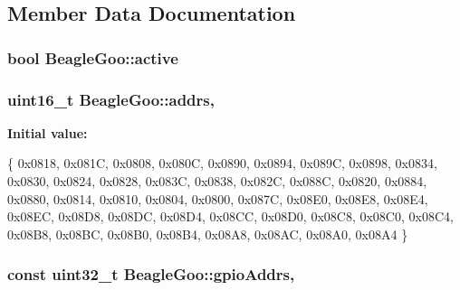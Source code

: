 \subsection{Member Data Documentation}
\hypertarget{struct_beagle_goo_a64e92bad467b29cb868bec64d1f6be6f}{
\subsubsection[{active}]{\setlength{\rightskip}{0pt plus 5cm}bool Beagle\-Goo\-::active\hspace{0.3cm}{\ttfamily [protected]}}}\label{struct_beagle_goo_a64e92bad467b29cb868bec64d1f6be6f}
\hypertarget{struct_beagle_goo_a13b31f0a40c07bd0ca8c9d9fa51ae60a}{
\subsubsection[{addrs}]{\setlength{\rightskip}{0pt plus 5cm}uint16\-\_\-t Beagle\-Goo\-::addrs\hspace{0.3cm}{\ttfamily [static]}, {\ttfamily [protected]}}}\label{struct_beagle_goo_a13b31f0a40c07bd0ca8c9d9fa51ae60a}
{\bfseries Initial value\-:}
\begin{DoxyCode}

        \{ 0x0818, 0x081C, 0x0808,                       
                        0x080C, 0x0890, 0x0894, 0x089C, 0x0898, 
                        0x0834, 0x0830, 0x0824, 0x0828, 0x083C, 
                        0x0838, 0x082C, 0x088C, 0x0820, 0x0884, 
                        0x0880, 0x0814, 0x0810, 0x0804, 0x0800, 
                        0x087C, 0x08E0, 0x08E8, 0x08E4, 0x08EC, 
                        0x08D8, 0x08DC, 0x08D4, 0x08CC, 0x08D0, 
                        0x08C8, 0x08C0, 0x08C4, 0x08B8, 0x08BC, 
                        0x08B0, 0x08B4, 0x08A8, 0x08AC, 0x08A0, 
                        0x08A4                                  
                \}
\end{DoxyCode}
\hypertarget{struct_beagle_goo_a709c4761b20d2db44096036573d3285f}{
\subsubsection[{gpio\-Addrs}]{\setlength{\rightskip}{0pt plus 5cm}const uint32\-\_\-t Beagle\-Goo\-::gpio\-Addrs\hspace{0.3cm}{\ttfamily [static]}, {\ttfamily [protected]}}}\label{struct_beagle_goo_a709c4761b20d2db44096036573d3285f}
